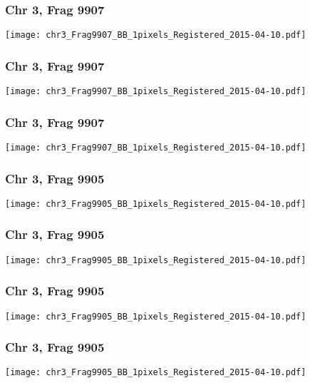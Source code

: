 \documentclass[10pt,dvipsnames,table]{beamer}
\begin{document}
\begin{frame}
\frametitle{Chr 3, Frag 9907}
\begin{center}
\texttt{[image: chr3\_Frag9907\_BB\_1pixels\_Registered\_2015-04-10.pdf]}
\end{center}
\end{frame}

\begin{frame}
\frametitle{Chr 3, Frag 9907}
\begin{center}
\texttt{[image: chr3\_Frag9907\_BB\_1pixels\_Registered\_2015-04-10.pdf]}
\end{center}
\end{frame}

\begin{frame}
\frametitle{Chr 3, Frag 9907}
\begin{center}
\texttt{[image: chr3\_Frag9907\_BB\_1pixels\_Registered\_2015-04-10.pdf]}
\end{center}
\end{frame}

\begin{frame}
\frametitle{Chr 3, Frag 9905}
\begin{center}
\texttt{[image: chr3\_Frag9905\_BB\_1pixels\_Registered\_2015-04-10.pdf]}
\end{center}
\end{frame}

\begin{frame}
\frametitle{Chr 3, Frag 9905}
\begin{center}
\texttt{[image: chr3\_Frag9905\_BB\_1pixels\_Registered\_2015-04-10.pdf]}
\end{center}
\end{frame}

\begin{frame}
\frametitle{Chr 3, Frag 9905}
\begin{center}
\texttt{[image: chr3\_Frag9905\_BB\_1pixels\_Registered\_2015-04-10.pdf]}
\end{center}
\end{frame}

\begin{frame}
\frametitle{Chr 3, Frag 9905}
\begin{center}
\texttt{[image: chr3\_Frag9905\_BB\_1pixels\_Registered\_2015-04-10.pdf]}
\end{center}
\end{frame}
\end{document}
